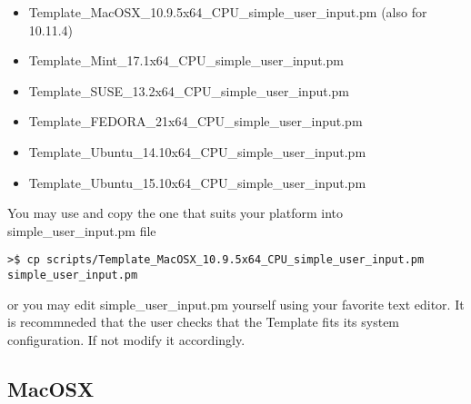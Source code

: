 \documentclass[review]{elsarticle}
\begin{document}
\begin{itemize}
\item Template\_MacOSX\_10.9.5x64\_CPU\_simple\_user\_input.pm (also for 10.11.4)
\item Template\_Mint\_17.1x64\_CPU\_simple\_user\_input.pm
\item Template\_SUSE\_13.2x64\_CPU\_simple\_user\_input.pm
\item Template\_FEDORA\_21x64\_CPU\_simple\_user\_input.pm
\item Template\_Ubuntu\_14.10x64\_CPU\_simple\_user\_input.pm
\item Template\_Ubuntu\_15.10x64\_CPU\_simple\_user\_input.pm
\end{itemize}

You may use and copy the one that suits your platform into
simple\_user\_input.pm file

\begin{verbatim}
>$ cp scripts/Template_MacOSX_10.9.5x64_CPU_simple_user_input.pm simple_user_input.pm
\end{verbatim}
    
or you may edit simple\_user\_input.pm yourself using your favorite
text editor. It is recommneded that the user checks that the Template
fits its system configuration. If not modify it accordingly.

\subsection{MacOSX}
\label{inst_mac}
\end{document}
